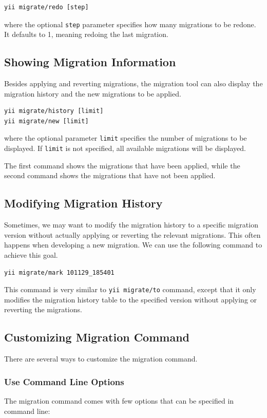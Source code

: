 \begin{lstlisting}
yii migrate/redo [step]
\end{lstlisting}
where the optional \lstinline|step| parameter specifies how many migrations to be redone.
It defaults to 1, meaning redoing the last migration.

\subsection{Showing Migration Information}
Besides applying and reverting migrations, the migration tool can also display
the migration history and the new migrations to be applied.

\begin{lstlisting}
yii migrate/history [limit]
yii migrate/new [limit]
\end{lstlisting}
where the optional parameter \lstinline|limit| specifies the number of migrations to be
displayed. If \lstinline|limit| is not specified, all available migrations will be displayed.

The first command shows the migrations that have been applied, while the second
command shows the migrations that have not been applied.

\subsection{Modifying Migration History}
Sometimes, we may want to modify the migration history to a specific migration
version without actually applying or reverting the relevant migrations. This
often happens when developing a new migration. We can use the following command
to achieve this goal.

\begin{lstlisting}
yii migrate/mark 101129_185401
\end{lstlisting}
This command is very similar to \lstinline|yii migrate/to| command, except that it only
modifies the migration history table to the specified version without applying
or reverting the migrations.

\subsection{Customizing Migration Command}
There are several ways to customize the migration command.

\subsubsection{Use Command Line Options}
The migration command comes with few options that can be specified in command
line:

